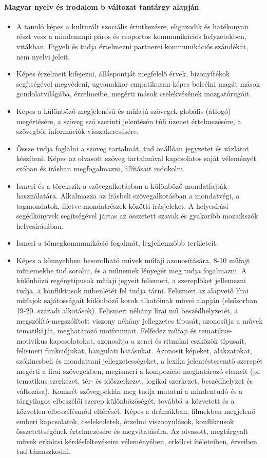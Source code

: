 \paragraph{Magyar nyelv és irodalom
	b változat tantárgy alapján}
\begin{itemize}
\item A tanuló képes a kulturált szociális érintkezésre, eligazodik és hatékonyan részt vesz a mindennapi páros és csoportos kommunikációs helyzetekben, vitákban. Figyeli és tudja értelmezni partnerei kommunikációs szándékát, nem nyelvi jeleit.
\item Képes érzelmeit kifejezni, álláspontját megfelelő érvek, bizonyítékok segítségével megvédeni, ugyanakkor empatikusan képes beleélni magát mások gondolatvilágába, érzelmeibe, megérti mások cselekvésének mozgatórugóit.
\item Képes a különböző megjelenésű és műfajú szövegek globális (átfogó) megértésére, a szöveg szó szerinti jelentésén túli üzenet értelmezésére, a szövegből információk visszakeresésére.
\item Össze tudja foglalni a szöveg tartalmát, tud önállóan jegyzetet és vázlatot készíteni. Képes az olvasott szöveg tartalmával kapcsolatos saját véleményét szóban és írásban megfogalmazni, állításait indokolni.
\item Ismeri és a törekszik a szövegalkotásban a különböző mondatfajták használatára. Alkalmazza az írásbeli szövegalkotásban a mondatvégi, a tagmondatok, illetve mondatrészek közötti írásjeleket. A helyesírási segédkönyvek segítségével jártas az összetett szavak és gyakoribb mozaikszók helyesírásában.
\item Ismeri a tömegkommunikáció fogalmát, legjellemzőbb területeit.
\item Képes a könnyebben besorolható művek műfaji azonosítására, 8-10 műfajt műnemekbe tud sorolni, és a műnemek lényegét meg tudja fogalmazni. A különböző regénytípusok műfaji jegyeit felismeri, a szereplőket jellemezni tudja, a konfliktusok mibenlétét fel tudja tárni. Felismeri az alapvető lírai műfajok sajátosságait különböző korok alkotóinak művei alapján (elsősorban 19-20. századi alkotások). Felismeri néhány lírai mű beszédhelyzetét, a megszólító-megszólított viszony néhány jellegzetes típusát, azonosítja a művek tematikáját, meghatározó motívumait. Felfedez műfaji és tematikus-motivikus kapcsolatokat, azonosítja a zenei és ritmikai eszközök típusait, felismeri funkciójukat, hangulati hatásukat. Azonosít képeket, alakzatokat, szókincsbeli és mondattani jellegzetességeket, a lexika jelentésteremtő szerepét megérti a lírai szövegekben, megismeri a kompozíció meghatározó elemeit (pl. tematikus szerkezet, tér- és időszerkezet, logikai szerkezet, beszédhelyzet és változása). Konkrét szövegpéldán meg tudja mutatni a mindentudó és a tárgyilagos elbeszélői szerep különbözőségét, továbbá a közvetett és a közvetlen elbeszélésmód eltérését. Képes a drámákban, filmekben megjelenő emberi kapcsolatok, cselekedetek, érzelmi viszonyulások, konfliktusok összetettségének értelmezésére és megvitatására. Az olvasott, megtárgyalt művek erkölcsi kérdésfeltevéseire véleményében, erkölcsi ítéleteiben, érveiben tud támaszkodni.

\end{itemize}
